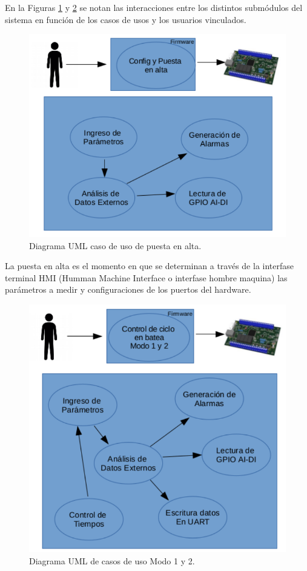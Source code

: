 En la Figuras \ref{fig:casoUsoAlta} y \ref{fig:casodeUso1y2} se notan las interacciones entre los distintos submódulos del sistema en función de los casos de usos y los usuarios vinculados.

\begin{figure}[h!]
	\centering
	\includegraphics[width=.9\textwidth]{Figures/Cap_2/caso_uso_Alta_UML}
	\caption{Diagrama UML caso de uso de puesta en alta.}
	\label{fig:casoUsoAlta}
\end{figure}

La puesta en alta es el momento en que se determinan a través de la interfase terminal HMI (Humman Machine Interface o interfase hombre maquina) las parámetros a medir y configuraciones de los puertos del hardware.

\begin{figure}[h!]
	\centering
	\includegraphics[width=.8\textwidth]{Figures/Cap_2/caso_uso_Marcha_UML}
	\caption{Diagrama UML de casos de uso Modo 1 y 2.}
	\label{fig:casodeUso1y2}
\end{figure}

